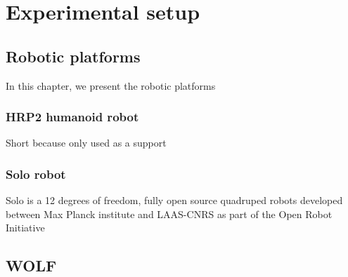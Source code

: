 \chapter{Experimental setup}
\minitoc
\bigskip



\section{Robotic platforms}

In this chapter, we present the robotic platforms

\subsection{HRP2 humanoid robot}
Short because only used as a support

\subsection{Solo robot}
Solo is a 12 degrees of freedom, fully open source quadruped robots developed between Max Planck institute and LAAS-CNRS as part of the Open Robot Initiative 
\cite{grimminger2020open} 

\section{WOLF}




